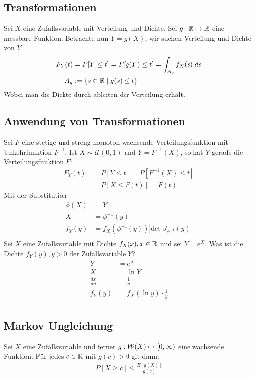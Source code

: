 \subsection*{Transformationen}
Sei $X$ eine Zufallsvariable mit Verteilung und Dichte. Sei $g: \mathbb{R} \mapsto \mathbb{R}$
eine messbare Funktion. Betrachte nun $Y = g (X)$, wir suchen Verteilung und
Dichte von $Y$:
\begin{align*}
  F_Y (t) & = P[Y \leq t] = P[g (Y) \leq t] = \int_{A_g} f_X (s) \; ds \\
  A_g     & := \{s \in \mathbb{R} \; | \; g (s) \leq t\}
\end{align*}
Wobei man die Dichte durch ableiten der Verteilung erhält.
\subsection*{Anwendung von Transformationen}
Sei $F$ eine stetige und streng monoton wachsende Verteilungsfunktion mit
Unkehrfunktion $F^{-1}$. Ist $X \sim \mathcal{U} (0, 1)$ und $Y = F^{-1} (X)$,
so hat $Y$ gerade die Verteilungsfunktion $F$:
\begin{align*}
  F_Y (t) & = P[Y \leq t] = P[F^{-1} (X) \leq t] \\
          & = P[X \leq F (t)] = F (t)
\end{align*}
Mit der Substitution
\begin{align*}
  \phi(X) & = Y                                              \\
  X       & = \phi^{-1}(y)                                   \\
  f_Y(y)  & = f_X(\phi^{-1}(y))|\text{det }J_{\phi^{-1}}(y)| \\
\end{align*}
\BoxStart{}
Sei $X$ eine Zufallsvariable mit Dichte $f_X(x), x \in \mathbb{R}$ und sei $Y = e^X$. Was ist die Dichte $f_Y(y), y > 0$ der Zufallsvariable $Y$?
\begin{align*}
  Y             & = e^X                          \\
  X             & = \ln Y                        \\
  \frac{dx}{dy} & = \frac{1}{y}                  \\
  f_Y(y)        & = f_X(\ln y) \cdot \frac{1}{y} \\
\end{align*}
\BoxEnd{}
\subsection*{Markov Ungleichung}
Sei $X$ eine Zufallsvariable und ferner $g : \mathcal{W} (X) \mapsto [0, \infty)$ eine
wachsende Funktion. Für jedes $c \in \mathbb{R}$ mit $g (c) > 0$ git dann:
\begin{align*}
  P[X \geq c] \leq \frac{E[g (X)]}{g (c)}
\end{align*}
